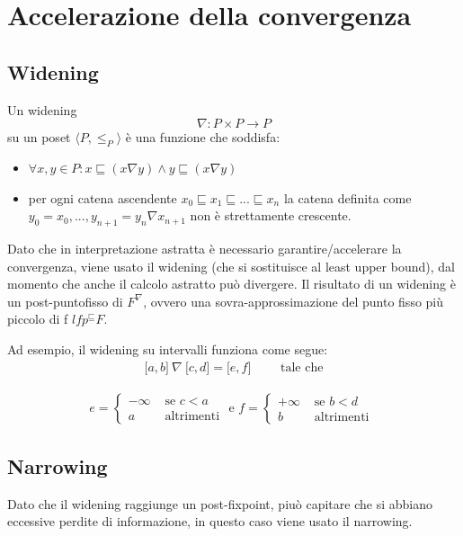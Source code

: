 \documentclass[a4paper, 10pt]{book}
\begin{document}
	\section{Accelerazione della convergenza}
	\subsection{Widening}
	Un widening \[ \nabla : P \times P \to P  \] su un poset $ \langle P, \leq_P \rangle $ è una funzione che soddisfa:
	\begin{itemize}
		\item $\forall x,y \in P : x \sqsubseteq (x \nabla y ) \wedge y \sqsubseteq (x \nabla y)$
		\item per ogni catena ascendente $x_0 \sqsubseteq x_1 \sqsubseteq ... \sqsubseteq x_n$ la catena definita come $y_0 = x_0, ..., y_{n+1} = y_n \nabla x_{n+1}$ non è strettamente crescente.
	\end{itemize}
	
	Dato che in interpretazione astratta è necessario garantire/accelerare la convergenza, viene usato il widening (che si sostituisce al least upper bound), dal momento che anche il calcolo astratto può divergere.
	Il risultato di un widening è un post-puntofisso  di $F^\nabla$, ovvero una sovra-approssimazione del punto fisso più piccolo di f $lfp^\sqsubseteq F$. 
	
	Ad esempio, il widening su intervalli funziona come segue:
	\begin{align*}
	\lbrack a, b \rbrack\ \nabla\ \lbrack c, d \rbrack = \lbrack e, f \rbrack \qquad \text{ tale che}
	\end{align*}
	
	\begin{align*}
	e = 
	\begin{cases}
	-\infty &\text{ se } c < a \\
	a &\text{ altrimenti}
	\end{cases}
	\text{ e } f = 
	\begin{cases}
	+\infty &\text{ se } b < d\\
	b &\text{ altrimenti }
	\end{cases}
	\end{align*}
	
	\subsection{Narrowing}
	Dato che il widening raggiunge un post-fixpoint, piuò capitare che si abbiano eccessive perdite di informazione, in questo caso viene usato il narrowing.
	
\end{document}
